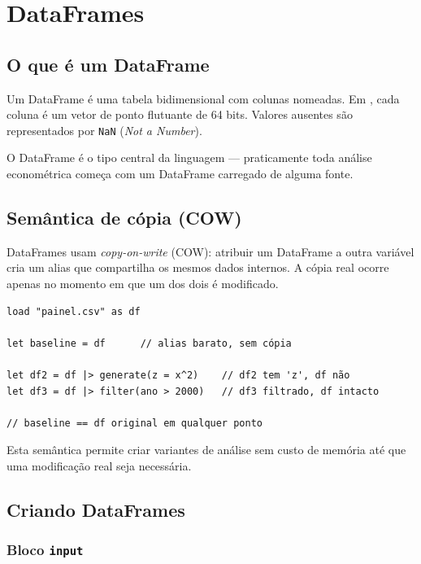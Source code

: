 \chapter{DataFrames}
\label{cap:dataframes}

\section{O que é um DataFrame}

Um DataFrame é uma tabela bidimensional com colunas nomeadas. Em \hayashi{}, cada
coluna é um vetor de ponto flutuante de 64 bits. Valores ausentes são representados
por \texttt{NaN} (\textit{Not a Number}).

O DataFrame é o tipo central da linguagem — praticamente toda análise econométrica
começa com um DataFrame carregado de alguma fonte.

\section{Semântica de cópia (COW)}

DataFrames usam \textit{copy-on-write} (COW): atribuir um DataFrame a outra variável
cria um alias que compartilha os mesmos dados internos. A cópia real ocorre apenas no
momento em que um dos dois é modificado.

\begin{lstlisting}[caption={COW: baseline preservado}]
load "painel.csv" as df

let baseline = df      // alias barato, sem cópia

let df2 = df |> generate(z = x^2)    // df2 tem 'z', df não
let df3 = df |> filter(ano > 2000)   // df3 filtrado, df intacto

// baseline == df original em qualquer ponto
\end{lstlisting}

Esta semântica permite criar variantes de análise sem custo de memória até que
uma modificação real seja necessária.

\section{Criando DataFrames}

\subsection*{Bloco \texttt{input}}

